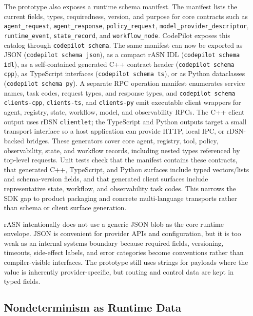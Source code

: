 \documentclass[manuscript,screen,review]{acmart}
\newcommand{\rasn}{rASN\xspace}
\newcommand{\rdsn}{rDSN\xspace}
\begin{document}
The prototype also exposes a runtime schema manifest. The manifest lists the
current fields, types, requiredness, version, and purpose for core contracts
such as \texttt{agent\_request}, \texttt{agent\_response},
\texttt{policy\_request}, \texttt{model\_provider\_descriptor},
\texttt{runtime\_event}, \texttt{state\_record}, and \texttt{workflow\_node}.
CodePilot exposes this catalog through
\texttt{codepilot schema}. The same manifest can now be exported as JSON
(\texttt{codepilot schema json}), as a compact rASN IDL
(\texttt{codepilot schema idl}), as a self-contained generated C++ contract
header (\texttt{codepilot schema cpp}), as TypeScript interfaces
(\texttt{codepilot schema ts}), or as Python dataclasses
(\texttt{codepilot schema py}). A separate RPC operation manifest enumerates
service names, task codes, request types, and response types, and
\texttt{codepilot schema clients-cpp}, \texttt{clients-ts}, and
\texttt{clients-py} emit executable client wrappers for agent, registry, state,
workflow, model, and observability RPCs. The C++ client output uses \rdsn
\texttt{clientlet}; the TypeScript and Python outputs target a small transport
interface so a host application can provide HTTP, local IPC, or \rdsn-backed
bridges. These generators cover core agent, registry, tool, policy,
observability, state, and workflow records, including nested types referenced by
top-level requests. Unit tests check that the manifest contains these contracts,
that generated C++, TypeScript, and Python surfaces include typed vectors/lists
and schema-version fields, and that generated client surfaces include
representative state, workflow, and observability task codes. This narrows the
SDK gap to product packaging and concrete multi-language transports rather than
schema or client surface generation.

\rasn intentionally does not use a generic JSON blob as the core runtime
envelope. JSON is convenient for provider APIs and configuration, but it is too
weak as an internal systems boundary because required fields, versioning,
timeouts, side-effect labels, and error categories become conventions rather
than compiler-visible interfaces. The prototype still uses strings for payloads
where the value is inherently provider-specific, but routing and control data
are kept in typed fields.

\subsection{Nondeterminism as Runtime Data}
\end{document}
